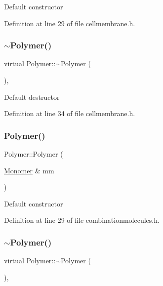 Default constructor 

Definition at line 29 of file cellmembrane.\+h.

\mbox{\label{class_polymer_aac2b3983f375a5691c7d5ca1a79594d5}} 
\subsubsection{\texorpdfstring{$\sim$\+Polymer()}{~Polymer()}\hspace{0.1cm}{\footnotesize\ttfamily [2/11]}}
{\footnotesize\ttfamily virtual Polymer\+::$\sim$\+Polymer (\begin{DoxyParamCaption}{ }\end{DoxyParamCaption})\hspace{0.3cm}{\ttfamily [inline]}, {\ttfamily [virtual]}}

Default destructor 

Definition at line 34 of file cellmembrane.\+h.

\mbox{\label{class_polymer_ae77454a3908652e4df6a26b9cac509a5}} 
\subsubsection{\texorpdfstring{Polymer()}{Polymer()}\hspace{0.1cm}{\footnotesize\ttfamily [3/14]}}
{\footnotesize\ttfamily Polymer\+::\+Polymer (\begin{DoxyParamCaption}\item[{\mbox{\hyperlink{class_monomer}{Monomer}} \&}]{mm }\end{DoxyParamCaption})\hspace{0.3cm}{\ttfamily [inline]}}

Default constructor 

Definition at line 29 of file combinationmolecules.\+h.

\mbox{\label{class_polymer_aac2b3983f375a5691c7d5ca1a79594d5}} 
\subsubsection{\texorpdfstring{$\sim$\+Polymer()}{~Polymer()}\hspace{0.1cm}{\footnotesize\ttfamily [3/11]}}
{\footnotesize\ttfamily virtual Polymer\+::$\sim$\+Polymer (\begin{DoxyParamCaption}{ }\end{DoxyParamCaption})\hspace{0.3cm}{\ttfamily [inline]}, {\ttfamily [virtual]}}

